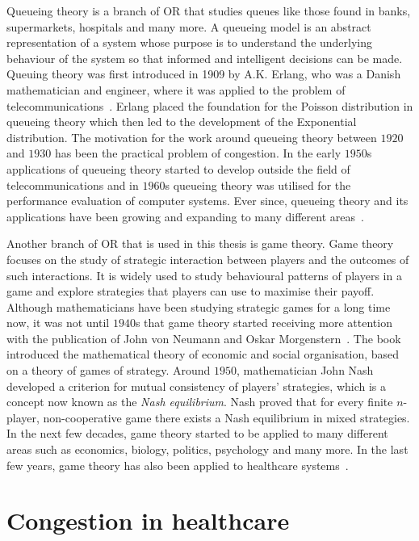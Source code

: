 Queueing theory is a branch of OR that studies queues like those found in
banks, supermarkets, hospitals and many more.
A queueing model is an abstract representation of a system whose purpose is
to understand the underlying behaviour of the system so that informed and
intelligent decisions can be made.
Queuing theory was first introduced in 1909 by A.K. Erlang, who was a Danish
mathematician and engineer, where it was applied to the problem of
telecommunications~\cite{erlang1909}.
Erlang placed the foundation for the Poisson distribution in queueing theory
which then led to the development of the Exponential distribution.
The motivation for the work around queueing theory between \(1920\) and
\(1930\) has been the practical problem of congestion.
In the early \(1950\)s applications of queueing theory started to develop
outside the field of telecommunications and in \(1960\)s queueing theory
was utilised for the performance evaluation of computer systems.
Ever since, queueing theory and its applications have been growing and
expanding to many different areas~\cite{sztrik2010queueing}.

Another branch of OR that is used in this thesis is game theory.
Game theory focuses on the study of strategic interaction between players and
the outcomes of such interactions.
It is widely used to study behavioural patterns of players in a game and
explore strategies that players can use to maximise their payoff.
Although mathematicians have been studying strategic games for a long time now,
it was not until \(1940\)s that game theory started receiving more attention
with the publication of John von Neumann and Oskar
Morgenstern~\cite{von1947theory}.
The book introduced the mathematical theory of economic and social organisation,
based on a theory of games of strategy.
Around \(1950\), mathematician John Nash developed a criterion for mutual
consistency of players' strategies, which is a concept now known as the
\textit{Nash equilibrium}.
Nash proved that for every finite \(n\)-player, non-cooperative game there
exists a Nash equilibrium in mixed strategies.
In the next few decades, game theory started to be applied to many different
areas such as economics, biology, politics, psychology and many more.
In the last few years, game theory has also been applied to healthcare
systems~\cite{koutsoupias1999worst, TwoTierHealthcareSystem}.



\section{Congestion in healthcare}\label{sec:intro_healthcare_congestion}

